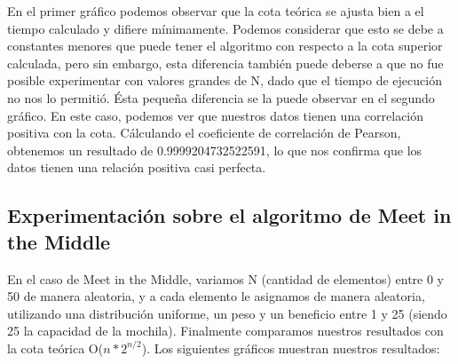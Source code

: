 En el primer gráfico podemos observar que la cota teórica se ajusta bien a el tiempo calculado y difiere mínimamente. Podemos considerar que esto se debe a constantes menores que puede tener el algoritmo con respecto a la cota superior calculada, pero sin embargo, esta diferencia también puede deberse a que no fue posible experimentar con valores grandes de N, dado que el tiempo de ejecución no nos lo permitió.
\newline
Ésta pequeña diferencia se la puede observar en el segundo gráfico. En este caso, podemos ver que nuestros datos tienen una correlación positiva con la cota. Cálculando el coeficiente de correlación de Pearson, obtenemos un resultado de 0.9999204732522591, lo que nos confirma que los datos tienen una relación positiva casi perfecta.

\subsection{Experimentación sobre el algoritmo de Meet in the Middle}

En el caso de Meet in the Middle, variamos N (cantidad de elementos) entre 0 y 50 de manera aleatoria, y a cada elemento le asignamos de manera aleatoria, utilizando una distribución uniforme, un peso y un beneficio entre 1 y 25 (siendo 25 la capacidad de la mochila). Finalmente comparamos nuestros resultados con la cota teórica O($n*2^{n/2}$). Los siguientes gráficos muestran nuestros resultados:

